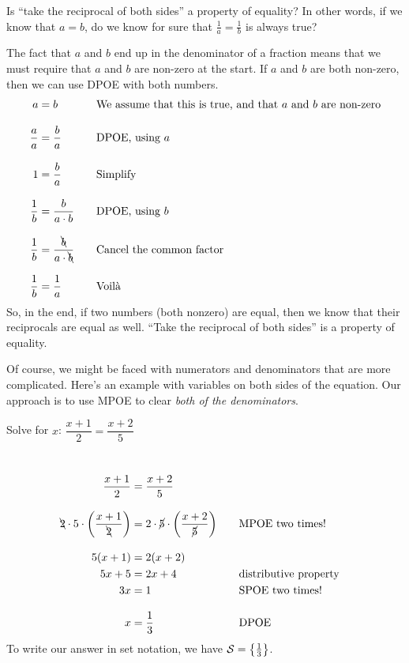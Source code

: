 \begin{boxeddef}
Is ``take the reciprocal of both sides'' a property of equality? In other words, if we know that $a = b$, do we know for sure that $\frac{1}{a} = \frac{1}{b}$ is always true?

The fact that $a$ and $b$ end up in the denominator of a fraction means that we must require that $a$ and $b$ are non-zero at the start. If $a$ and $b$ are both non-zero, then we can use DPOE with both numbers.
\[\begin{aligned}
a &= b
&&\text{\quad We assume that this is true, and that $a$ and $b$ are non-zero}
\\[2ex]
\frac{a}{a} &= \frac{b}{a}
&&\text{\quad DPOE, using $a$}
\\[2ex]
1 &= \frac{b}{a}
&&\text{\quad Simplify}
\\[2ex]
\frac{1}{b} &= \frac{b}{a\cdot b}
&&\text{\quad DPOE, using $b$}
\\[2ex]
\frac{1}{b} &= \frac{\bcancel{b}}{a\cdot \bcancel{b}}
&&\text{\quad Cancel the common factor}
\\[2ex]
\frac{1}{b} &= \frac{1}{a}
&&\text{\quad Voil\`a}
\end{aligned}\]
So, in the end, if two numbers (both nonzero) are equal, then we know that their reciprocals are equal as well. ``Take the reciprocal of both sides'' is a property of equality.
\end{boxeddef}

Of course, we might be faced with numerators and denominators that are more complicated. Here's an example with variables on both sides of the equation. Our approach is to use MPOE to clear \textit{both of the denominators}.

\begin{boxedex}
Solve for $x$: $\dfrac{x+1}{2}=\dfrac{x+2}{5}$

\exsoln\
\[\begin{aligned}
\dfrac{x+1}{2} &=\dfrac{x+2}{5}
\\[2ex]
\bcancel{2}\cdot5\cdot\left(\frac{x+1}{\bcancel{2}}\right) &=
2\cdot\cancel{5}\cdot\left(\frac{x+2}{\cancel{5}}\right)
&&\quad\text{MPOE two times!}
\\[2ex]
5(x+1) &= 2(x+2)
\\
5x+5 &= 2x+4
&&\quad\text{distributive property}
\\
3x &= 1
&&\quad\text{SPOE two times!}
\\[2ex]
x &= \dfrac{1}{3}
&&\quad\text{DPOE}
\end{aligned}\]
To write our answer in set notation, we have $\mathcal{S}=\left\{\frac{1}{3}\right\}$.
\end{boxedex}

